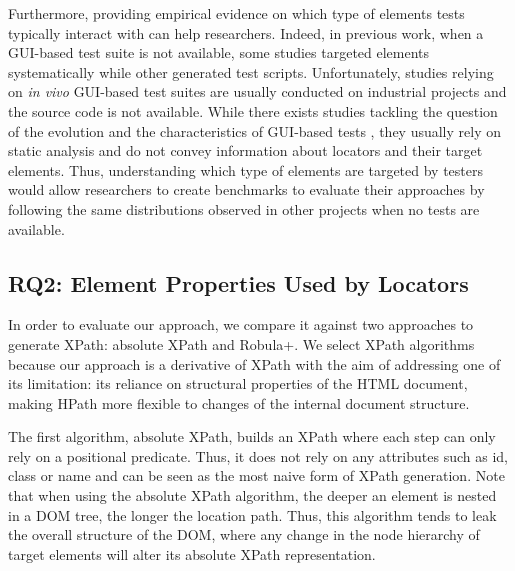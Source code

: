 Furthermore, providing empirical evidence on which type of elements tests typically interact with can help researchers. Indeed, in previous work, when a GUI-based test suite is not available, some studies targeted elements systematically\cite{Cohen2015, Leotta2015, Aldalur2017, Eladawy2018} while other generated test scripts\cite{Grechanik2009, Montoto2011, Kirinuki2019}. Unfortunately, studies relying on \emph{in vivo} GUI-based test suites are usually conducted on industrial projects and the source code is not available\cite{Thummalapenta2013, Yandrapally2014}. While there exists studies tackling the question of the evolution and the characteristics of GUI-based tests \cite{Christophe2014, Rwemalika2019}, they usually rely on static analysis and do not convey information about locators and their target elements. Thus, understanding which type of elements are targeted by testers would allow researchers to create benchmarks to evaluate their approaches by following the same distributions observed in other projects when no tests are available.

\subsection{RQ2: Element Properties Used by Locators}
\label{sec:hpath-protocol-rq2}

In order to evaluate our approach, we compare it against two approaches to generate XPath: absolute XPath and Robula+. We select XPath algorithms because our approach is a derivative of XPath with the aim of addressing one of its limitation: its reliance on structural properties of the HTML document, making HPath more flexible to changes of the internal document structure.

The first algorithm, absolute XPath, builds an XPath where each step can only rely on a positional predicate. Thus, it does not rely on any attributes such as id, class or name and can be seen as the most naive form of XPath generation. Note that when using the absolute XPath algorithm, the deeper an element is nested in a DOM tree, the longer the location path. Thus, this algorithm tends to leak the overall structure of the DOM, where any change in the node hierarchy of target elements will alter its absolute XPath representation.

